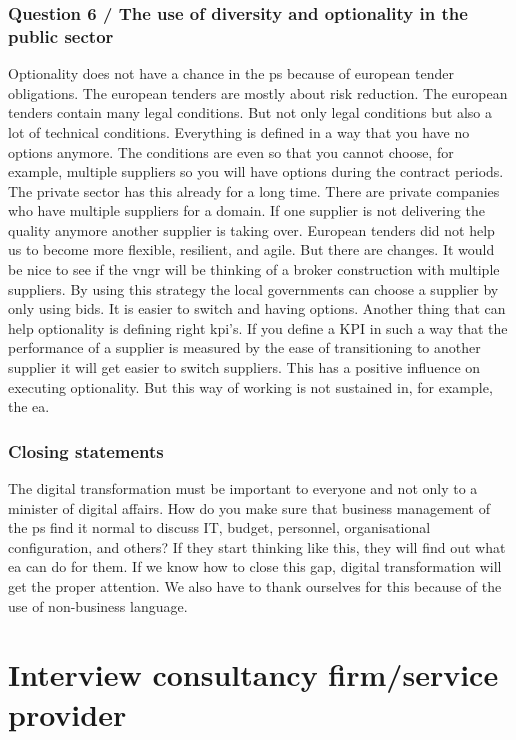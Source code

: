 \subsubsection{Question 6 / The use of diversity and optionality in the public sector}
Optionality does not have a chance in the \gls{ps} because of european tender obligations. The european tenders are mostly about risk reduction. The european tenders contain many legal conditions. But not only legal conditions but also a lot of technical conditions. Everything is defined in a way that you have no options anymore. The conditions are even so that you cannot choose, for example, multiple suppliers so you will have options during the contract periods. The private sector has this already for a long time. There are private companies who have multiple suppliers for a domain. If one supplier is not delivering the quality anymore another supplier is taking over. European tenders did not help us to become more flexible, resilient, and agile. But there are changes. It would be nice to see if the \acrfull{vngr} will be thinking of a broker construction with multiple suppliers. By using this strategy the local governments can choose a supplier by only using bids. It is easier to switch and having options. Another thing that can help optionality is defining right \acrfull{kpi}'s. If you define a KPI in such a way that the performance of a supplier is measured by the ease of transitioning to another supplier it will get easier to switch suppliers. This has a positive influence on executing optionality. But this way of working is not sustained in, for example, the \gls{ea}.
\subsubsection{Closing statements}
The digital transformation must be important to everyone and not only to a minister of digital affairs. How do you make sure that business management of the \gls{ps} find it normal to discuss IT, budget, personnel, organisational configuration, and others? If they start thinking like this, they will find out what \gls{ea} can do for them. If we know how to close this gap, digital transformation will get the proper attention. We also have to thank ourselves for this because of the use of non-business language.
\section{Interview consultancy firm/service provider}
\label{sec:interviewconsultancyfirm}
